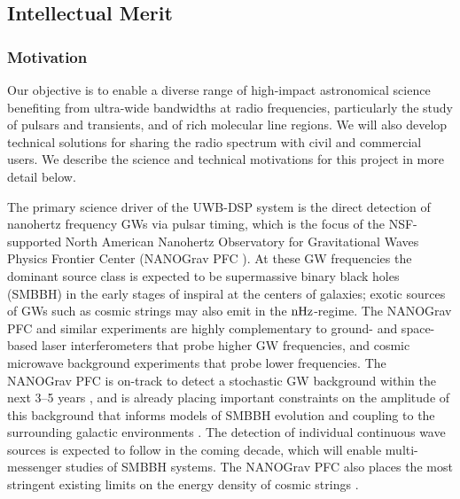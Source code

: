\documentclass[10pt]{myNSF}
\begin{document}
\subsection{Intellectual Merit}
\label{sec:IM}

\subsubsection{Motivation}
\label{sec:motivation}

Our objective is to enable a diverse range of high-impact astronomical
science benefiting from ultra-wide bandwidths at radio frequencies,
particularly the study of pulsars and transients, and of rich
molecular line regions.  We will also develop technical solutions for
sharing the radio spectrum with civil and commercial users.  We
describe the science and technical motivations for this project in
more detail below.

\label{sec:science_motivation}

 The primary science driver
of the UWB-DSP system is the direct detection of nanohertz frequency
GWs via pulsar timing, which is the focus of the NSF-supported North
American Nanohertz Observatory for Gravitational Waves Physics
Frontier Center (NANOGrav PFC \citealt{mcl13}).  At these GW
frequencies the dominant source class is expected to be supermassive
binary black holes (SMBBH) in the early stages of inspiral at the
centers of galaxies; exotic sources of GWs such as cosmic strings may
also emit in the $\textrm{nHz}$-regime.  The NANOGrav PFC and similar
experiments are highly complementary to ground- and space-based laser
interferometers that probe higher GW frequencies, and cosmic microwave
background experiments that probe lower frequencies.  The NANOGrav PFC
is on-track to detect a stochastic GW background within the next 3--5
years \citep{tve+15}, and is already placing important constraints on
the amplitude of this background that informs models of SMBBH
evolution and coupling to the surrounding galactic environments
\citep{abb+16,abb+18}.  The detection of individual continuous wave
sources is expected to follow in the coming decade, which will enable
multi-messenger studies of SMBBH systems.  The NANOGrav PFC also
places the most stringent existing limits on the energy density of
cosmic strings \citep{abb+18}.
\end{document}
